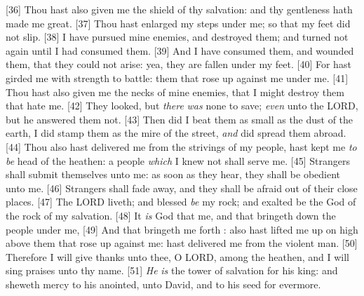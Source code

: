 [36] \textcolor[cmyk]{0.99998,1,0,0}{Thou hast also given me the shield of thy salvation: and thy gentleness hath made me great.}
[37] \textcolor[cmyk]{0.99998,1,0,0}{Thou hast enlarged my steps under me; so that my feet did not slip.}
[38] \textcolor[cmyk]{0.99998,1,0,0}{I have pursued mine enemies, and destroyed them; and turned not again until I had consumed them.}
[39] \textcolor[cmyk]{0.99998,1,0,0}{And I have consumed them, and wounded them, that they could not arise: yea, they are fallen under my feet.}
[40] \textcolor[cmyk]{0.99998,1,0,0}{For   hast girded me with strength to battle: them that rose up against me  under me.}
[41] \textcolor[cmyk]{0.99998,1,0,0}{Thou hast also given me the necks of mine enemies, that I might destroy them that hate me.}
[42] \textcolor[cmyk]{0.99998,1,0,0}{They looked, but \emph{there} \emph{was} none to save; \emph{even} unto the LORD, but he answered them not.}
[43] \textcolor[cmyk]{0.99998,1,0,0}{Then did I beat them as small as the dust of the earth, I did stamp them as the mire of the street, \emph{and} did spread them abroad.}
[44] \textcolor[cmyk]{0.99998,1,0,0}{Thou also hast delivered me from the strivings of my people,   hast kept me \emph{to} \emph{be} head of the heathen: a people \emph{which} I knew not shall serve me.}
[45] \textcolor[cmyk]{0.99998,1,0,0}{Strangers shall submit themselves unto me: as soon as they hear, they shall be obedient unto me.}
[46] \textcolor[cmyk]{0.99998,1,0,0}{Strangers shall fade away, and they shall be afraid out of their close places.}
[47] \textcolor[cmyk]{0.99998,1,0,0}{The LORD liveth; and blessed \emph{be} my rock; and exalted be the God of the rock of my salvation.}
[48] \textcolor[cmyk]{0.99998,1,0,0}{It \emph{is} God that  me, and that bringeth down the people under me,}
[49] \textcolor[cmyk]{0.99998,1,0,0}{And that bringeth me forth :   also hast lifted me up on high above them that rose up against me:   hast delivered me from the violent man.}
[50] \textcolor[cmyk]{0.99998,1,0,0}{Therefore I will give thanks unto thee, O LORD, among the heathen, and I will sing praises unto thy name.}
[51] \textcolor[cmyk]{0.99998,1,0,0}{\emph{He} \emph{is} the tower of salvation for his king: and sheweth mercy to his anointed, unto David, and to his seed for evermore.}